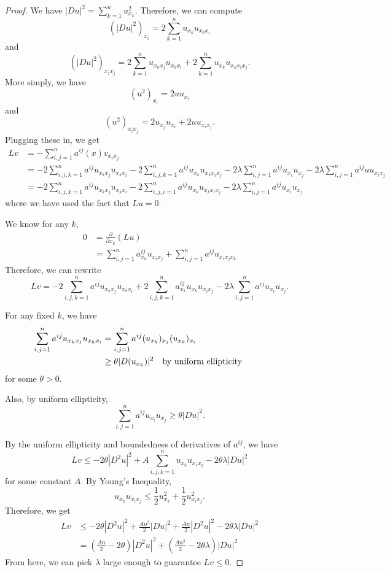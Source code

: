 \documentclass[a4paper]{article}
\begin{document}
\begin{enumerate}
    \begin{proof}
      We have $|Du|^2 = \sum_{k=1}^n u_{x_k}^2$. Therefore, we can compute
      \[ \left( |Du|^2 \right)_{x_i} = 2 \sum_{k=1}^n u_{x_k} u_{x_k x_i} \]
      and
      \[ \left( |Du|^2 \right)_{x_i x_j} = 2 \sum_{k=1}^n u_{x_k x_j} u_{x_k x_i} + 2 \sum_{k=1}^n u_{x_k} u_{x_k x_i x_j} .\]
      More simply, we have
      \[ (u^2)_{x_i} = 2 u u_{x_i} \]
      and
      \[ (u^2)_{x_i x_j} = 2 u_{x_j} u_{x_i} + 2 u u_{x_i x_j} .\]
      Plugging these in, we get
      \begin{align*}
        Lv &= - \sum_{i,j=1}^n a^{ij}(x) v_{x_i x_j} \\
        &= - 2 \sum_{i,j,k=1}^n a^{ij} u_{x_k x_j} u_{x_k x_i} - 2 \sum_{i,j,k=1}^n a^{ij} u_{x_k} u_{x_k x_i x_j} - 2 \lambda \sum_{i,j=1}^n a^{ij} u_{x_i} u_{x_j}
        - 2 \lambda \sum_{i,j=1}^n a^{ij} u u_{x_i x_j} \\
        &= - 2 \sum_{i,j,k=1}^n a^{ij} u_{x_k x_j} u_{x_k x_i} - 2 \sum_{i,j,i=1}^n a^{ij} u_{x_k} u_{x_k x_i x_j} - 2 \lambda \sum_{i,j=1}^n a^{ij} u_{x_i} u_{x_j}
      \end{align*}
      where we have used the fact that $Lu = 0$.

      We know for any $k$,
      \begin{align*}
        0 &= \frac{\partial}{\partial x_k} (Lu) \\
        &= \sum_{i,j=1}^n a^{ij}_{x_k} u_{x_i x_j} + \sum_{i,j=1}^n a^{ij} u_{x_i x_j x_k}
      \end{align*}
      Therefore, we can rewrite
      \[ Lv = -2 \sum_{i,j,k=1}^n a^{ij} u_{x_k x_j} u_{x_k x_i} + 2 \sum_{i,j,k=1}^n a^{ij}_{x_k} u_{x_k} u_{x_i x_j} - 2 \lambda \sum_{i,j=1}^n
      a^{ij} u_{x_i} u_{x_j} .\]

      For any fixed $k$, we have
      \begin{align*}
        \sum_{i,j=1}^n a^{ij} u_{x_k x_j} u_{x_k x_i} &= \sum_{i,j=1}^n a^{ij} (u_{x_k})_{x_j} (u_{x_k})_{x_i} \\
        &\geq \theta |D(u_{x_k})|^2 \quad \parbox{5cm}{by uniform ellipticity}
      \end{align*}
      for some $\theta > 0$.

      Also, by uniform ellipticity,
      \[ \sum_{i,j=1}^n a^{ij} u_{x_i} u_{x_j} \geq \theta |Du|^2 .\]

      By the uniform ellipticity and boundedness of derivatives of $a^{ij}$, we have
      \[ Lv \leq -2 \theta |D^2 u|^2 + A \sum_{i,j,k=1}^n u_{x_k} u_{x_i x_j} - 2 \theta \lambda |Du|^2 \]
      for some constant $A$. By Young's Inequality,
      \[ u_{x_k} u_{x_i x_j} \leq \frac{1}{2} u_{x_k}^2 + \frac{1}{2} u_{x_i x_j}^2 .\]
      Therefore, we get
      \begin{align*}
        Lv &\leq -2 \theta |D^2u|^2 + \frac{A n^2}{2} |Du|^2 + \frac{A n}{2} |D^2 u|^2 - 2\theta \lambda |Du|^2 \\
        &= \left( \frac{A n}{2} - 2 \theta \right) |D^2 u|^2 + \left(\frac{A n^2}{2} - 2 \theta \lambda \right) |Du|^2
      \end{align*}
      From here, we can pick $\lambda$ large enough to guarantee $Lv \leq 0$.


\end{proof}
\end{enumerate}
\end{document}

